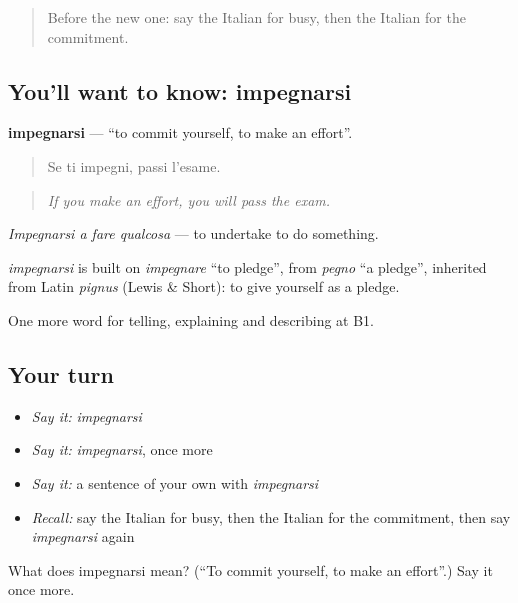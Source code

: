 \begin{quote}
Before the new one: say the Italian for busy, then the Italian for the commitment.
\end{quote}

\subsection*{You'll want to know: impegnarsi}
\textbf{impegnarsi} — \textquotedblleft{}to commit yourself, to make an effort\textquotedblright{}.

\begin{quote}
Se ti impegni, passi l'esame.
\end{quote}

\begin{quote}
\emph{If you make an effort, you will pass the exam.}
\end{quote}

\emph{Impegnarsi a fare qualcosa} — to undertake to do something.

\begin{cousinweb}
\emph{impegnarsi} is built on \emph{impegnare} \textquotedblleft{}to pledge\textquotedblright{}, from \emph{pegno} \textquotedblleft{}a pledge\textquotedblright{}, inherited from Latin \emph{pignus} (Lewis \& Short): to give yourself as a pledge.
\end{cousinweb}

\begin{grammarlens}[title={What you've built}]
One more word for telling, explaining and describing at B1.
\end{grammarlens}

\subsection*{Your turn}
\begin{itemize}
\raggedright
  \item \emph{Say it:} \emph{impegnarsi}
  \item \emph{Say it:} \emph{impegnarsi}, once more
  \item \emph{Say it:} a sentence of your own with \emph{impegnarsi}
  \item \emph{Recall:} say the Italian for busy, then the Italian for the commitment, then say \emph{impegnarsi} again
\end{itemize}

\begin{tcolorbox}[breakable,colback=teal!4,colframe=teal!35!black,title={Before you move on}]
What does impegnarsi mean? (\textquotedblleft{}To commit yourself, to make an effort\textquotedblright{}.) Say it once more.
\end{tcolorbox}
